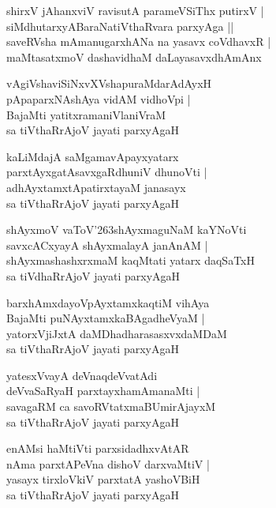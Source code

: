 \documentclass[twoside,12pt,openright]{book}
\def\S{\char'263}
\newcounter{shloka}[chapter]
\begin{document}
\begin{shloka}%
shirxV jAhanxviV ravisutA parameVSiThx putirxV |\\
siMdhutarxyABaraNatiVthaRvara parxyAga ||\\
saveRVsha mAmanugarxhANa na yasavx coVdhavxR |\\
maMtasatxmoV dashavidhaM daLayasavxdhAmAnx
\end{shloka}

\begin{shloka}%
vAgiVshaviSiNxvXVshapuraMdarAdAyxH \\
pApaparxNAshAya vidAM vidhoVpi |\\
BajaMti yatitxramaniVlaniVraM \\
sa tiVthaRrAjoV jayati parxyAgaH 
\end{shloka}


\begin{shloka}%
kaLiMdajA saMgamavApayxyatarx \\
parxtAyxgatAsavxgaRdhuniV dhunoVti |\\
adhAyxtamxtApatirxtayaM janasayx \\
sa tiVthaRrAjoV jayati parxyAgaH 
\end{shloka}

\begin{shloka}%
shAyxmoV vaToV\S shAyxmaguNaM kaYNoVti \\
savxcACxyayA shAyxmalayA janAnAM |\\
shAyxmashashxrxmaM kaqMtati yatarx daqSaTxH \\
sa tiVdhaRrAjoV jayati parxyAgaH
\end{shloka}

\begin{shloka}%
barxhAmxdayoVpAyxtamxkaqtiM vihAya \\
BajaMti puNAyxtamxkaBAgadheVyaM |\\
yatorxVjiJxtA daMDhadharasasxvxdaMDaM \\
sa tiVthaRrAjoV jayati parxyAgaH 
\end{shloka}

\begin{shloka}%
yatesxVvayA deVnaqdeVvatAdi \\
deVvaSaRyaH parxtayxhamAmanaMti |\\
savagaRM ca savoRVtatxmaBUmirAjayxM \\
sa tiVthaRrAjoV jayati parxyAgaH
\end{shloka}

\begin{shloka}%
enAMsi haMtiVti parxsidadhxvAtAR \\
nAma parxtAPeVna dishoV darxvaMtiV |\\
yasayx tirxloVkiV parxtatA yashoVBiH \\
sa tiVthaRrAjoV jayati parxyAgaH 
\end{shloka}
\end{document}
